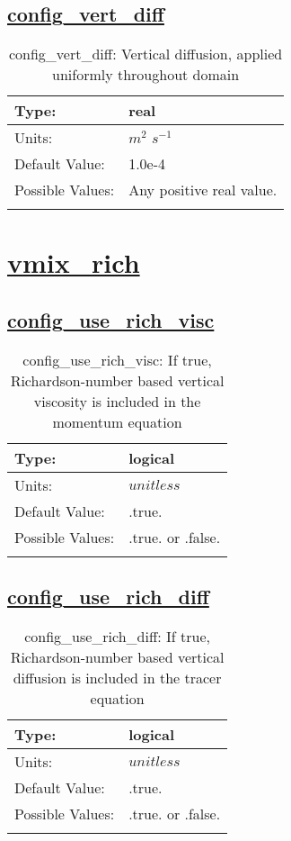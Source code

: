 \subsection[config\_vert\_diff]{\hyperref[sec:nm_tab_vmix_const]{config\_vert\_diff}}
\label{subsec:nm_sec_config_vert_diff}
\begin{center}
\begin{longtable}{| p{2.0in} | p{4.0in} |}
    \hline
    Type: & real \\
    \hline
    Units: & $m^2$ $s^{-1}$ \\
    \hline
    Default Value: & 1.0e-4 \\
    \hline
    Possible Values: & Any positive real value. \\
    \hline
    \caption{config\_vert\_diff: Vertical diffusion, applied uniformly throughout domain}
\end{longtable}
\end{center}
\section[vmix\_rich]{\hyperref[sec:nm_tab_vmix_rich]{vmix\_rich}}
\label{sec:nm_sec_vmix_rich}
\subsection[config\_use\_rich\_visc]{\hyperref[sec:nm_tab_vmix_rich]{config\_use\_rich\_visc}}
\label{subsec:nm_sec_config_use_rich_visc}
\begin{center}
\begin{longtable}{| p{2.0in} | p{4.0in} |}
    \hline
    Type: & logical \\
    \hline
    Units: & $unitless$ \\
    \hline
    Default Value: & .true. \\
    \hline
    Possible Values: & .true. or .false. \\
    \hline
    \caption{config\_use\_rich\_visc: If true, Richardson-number based vertical viscosity is included in the momentum equation}
\end{longtable}
\end{center}
\subsection[config\_use\_rich\_diff]{\hyperref[sec:nm_tab_vmix_rich]{config\_use\_rich\_diff}}
\label{subsec:nm_sec_config_use_rich_diff}
\begin{center}
\begin{longtable}{| p{2.0in} | p{4.0in} |}
    \hline
    Type: & logical \\
    \hline
    Units: & $unitless$ \\
    \hline
    Default Value: & .true. \\
    \hline
    Possible Values: & .true. or .false. \\
    \hline
    \caption{config\_use\_rich\_diff: If true, Richardson-number based vertical diffusion is included in the tracer equation}
\end{longtable}
\end{center}

